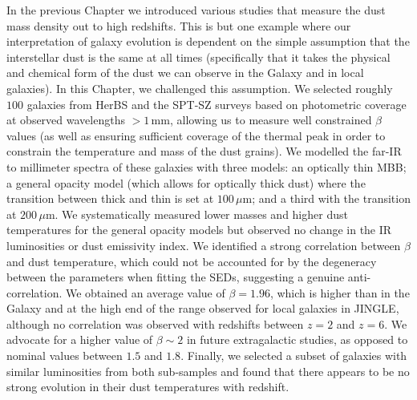 In the previous Chapter we introduced various studies that measure the dust mass density out to high redshifts. This is but one example where our interpretation of galaxy evolution is dependent on the simple assumption that the interstellar dust is the same at all times (specifically that it takes the physical and chemical form of the dust we can observe in the Galaxy and in local galaxies). In this Chapter, we challenged this assumption. We selected roughly $100$ galaxies from HerBS and the SPT-SZ surveys based on photometric coverage at observed wavelengths $>1\,$mm, allowing us to measure well constrained $\beta$ values (as well as ensuring sufficient coverage of the thermal peak in order to constrain the temperature and mass of the dust grains). We modelled the far-IR to millimeter spectra of these galaxies with three models: an optically thin MBB; a general opacity model (which allows for optically thick dust) where the transition between thick and thin is set at $100\,\mu$m; and a third with the transition at $200\,\mu$m. We systematically measured lower masses and higher dust temperatures for the general opacity models but observed no change in the IR luminosities or dust emissivity index. We identified a strong correlation between $\beta$ and dust temperature, which could not be accounted for by the degeneracy between the parameters when fitting the SEDs, suggesting a genuine anti-correlation. We obtained an average value of $\beta = 1.96$, which is higher than in the Galaxy and at the high end of the range observed for local galaxies in JINGLE, although no correlation was observed with redshifts between $z = 2$ and $z = 6$. We advocate for a higher value of $\beta \sim 2$ in future extragalactic studies, as opposed to nominal values between $1.5$ and $1.8$. Finally, we selected a subset of galaxies with similar luminosities from both sub-samples and found that there appears to be no strong evolution in their dust temperatures with redshift.
